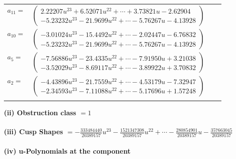 \documentclass[1p]{elsarticle_modified}
\theoremstyle{definition}
\begin{document}
\begin{tabular}{m{7pt} m{180pt} m{7pt} m{180pt} }
\flushright $a_{11}=$&$\begin{pmatrix}2.22207 u^{23}+6.52071 u^{22}+\cdots+3.73821 u-2.62904\\-5.23232 u^{23}-21.9699 u^{22}+\cdots-5.76267 u-4.13928\end{pmatrix}$ \\
\flushright $a_{10}=$&$\begin{pmatrix}-3.01024 u^{23}-15.4492 u^{22}+\cdots-2.02447 u-6.76832\\-5.23232 u^{23}-21.9699 u^{22}+\cdots-5.76267 u-4.13928\end{pmatrix}$ \\
\flushright $a_{5}=$&$\begin{pmatrix}-7.56886 u^{23}-23.4335 u^{22}+\cdots-7.91950 u+3.21038\\-3.52029 u^{23}-8.69117 u^{22}+\cdots-3.89922 u+3.70832\end{pmatrix}$ \\
\flushright $a_{2}=$&$\begin{pmatrix}-4.43896 u^{23}-21.7559 u^{22}+\cdots-4.53179 u-7.32947\\-2.34593 u^{23}-7.11088 u^{22}+\cdots-5.17696 u+1.57248\end{pmatrix}$\\&\end{tabular}
\flushleft \textbf{(ii) Obstruction class $= 1$}\\~\\
\flushleft \textbf{(iii) Cusp Shapes $= -\frac{333484440}{20389157} u^{23}-\frac{1521347308}{20389157} u^{22}+\cdots-\frac{280854901}{20389157} u-\frac{357663045}{20389157}$}\\~\\
\newpage\renewcommand{\arraystretch}{1}
\flushleft \textbf{(iv) u-Polynomials at the component}\newline \\
\end{document}
